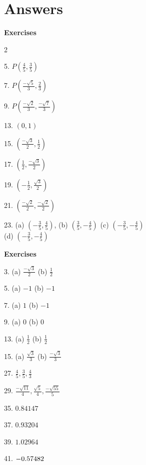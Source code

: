
\section{Answers}
\textbf{Exercises} 

\begin {multicols}{2}

5. $P \left (\frac{4}{5} ,\frac{3}{5}\right )$ 

7. $P \left (\frac{ -\sqrt{5}}{3} ,\frac{2}{3}\right )$ 

9. $P \left (\frac{ -\sqrt{2}}{3} ,\frac{ -\sqrt{7}}{3}\right )$ 

13. $\left (0 ,1\right )$ 

15. $\left (\frac{ -\sqrt{3}}{2} ,\frac{1}{2}\right )$ 

17. $\left (\frac{1}{2} ,\frac{ -\sqrt{3}}{2}\right )$ 

19. $\left ( -\frac{1}{2} ,\frac{\sqrt{3}}{2}\right )$ 

21. $\left (\frac{ -\sqrt{2}}{2} ,\frac{ -\sqrt{2}}{2}\right )$ 

23. (a) $\left ( -\frac{3}{5} ,\frac{4}{5}\right )$, (b) $\left (\frac{3}{5} , -\frac{4}{5}\right )$ (c) $\left ( -\frac{3}{5} , -\frac{4}{5}\right )$  \\\relax (d)
$\left ( -\frac{3}{5} , -\frac{4}{5}\right )$ 

\end{multicols}

\textbf{Exercises} 
\begin{multicols}{2}

3.
(a) $\frac{ -\sqrt{3}}{2}$ (b) $\frac{1}{2}$ 

5. (a) $ -1$ (b) $ -1$ 

7. (a) $1$ (b) $ -1$ 

9. (a) $0$ (b) $0$ 

13. (a) $\frac{1}{2}$ (b) $\frac{1}{2}$ 

15. (a) $\frac{\sqrt{3}}{3}$ (b) $\frac{ -\sqrt{3}}{3}$ 

27. $\frac{4}{5} ,\frac{3}{5} ,\frac{4}{3}$ 

29. $\frac{ -\sqrt{11}}{4} ,\frac{\sqrt{5}}{4} ,\frac{ -\sqrt{55}}{5}$ 

35. $0.84147$ 

37. $0.93204$ 

39. $1.02964$ 

41. $ -0.57482\vspace{+5.000000cm}$ 
\end{multicols}
\clearpage

